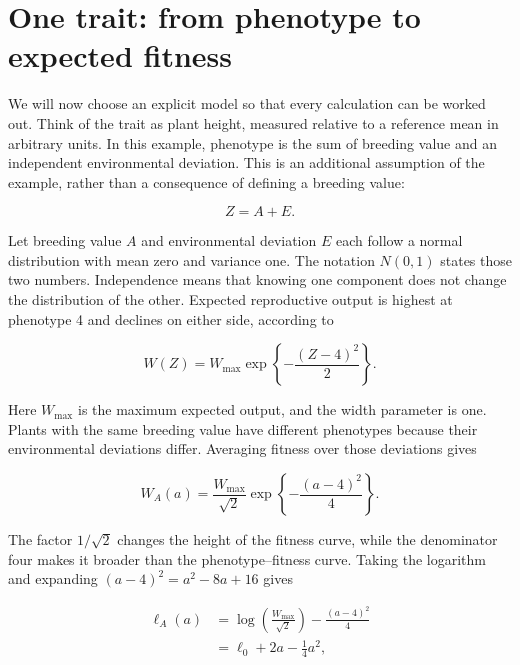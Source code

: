 \documentclass[11pt]{article}
\begin{document}
\section{One trait: from phenotype to expected fitness}
\label{sec:local}

We will now choose an explicit model so that every calculation can be worked out. Think of the trait as plant height, measured relative to a reference mean in arbitrary units. In this example, phenotype is the sum of breeding value and an independent environmental deviation. This is an additional assumption of the example, rather than a consequence of defining a breeding value:

\begin{equation}
Z=A+E.
\end{equation}

Let breeding value $A$ and environmental deviation $E$ each follow a normal distribution with mean zero and variance one. The notation $N(0,1)$ states those two numbers. Independence means that knowing one component does not change the distribution of the other. Expected reproductive output is highest at phenotype 4 and declines on either side, according to

\begin{equation}
W(Z)=W_{\max}\exp\left\{-\frac{(Z-4)^2}{2}\right\}.
\label{eq:guide-phenotype-fitness}
\end{equation}

Here $W_{\max}$ is the maximum expected output, and the width parameter is one. Plants with the same breeding value have different phenotypes because their environmental deviations differ. Averaging fitness over those deviations gives

\begin{equation}
W_A(a)=\frac{W_{\max}}{\sqrt{2}}
\exp\left\{-\frac{(a-4)^2}{4}\right\}.
\label{eq:guide-environmental-average}
\end{equation}

The factor $1/\sqrt{2}$ changes the height of the fitness curve, while the denominator four makes it broader than the phenotype--fitness curve. Taking the logarithm and expanding $(a-4)^2=a^2-8a+16$ gives

\begin{align}
\ell_A(a)
&=\log\left(\frac{W_{\max}}{\sqrt{2}}\right)-\frac{(a-4)^2}{4}\nonumber\\
&=\ell_0+2a-\frac14a^2,
\label{eq:guide-quadratic-example}
\end{align}
\end{document}
